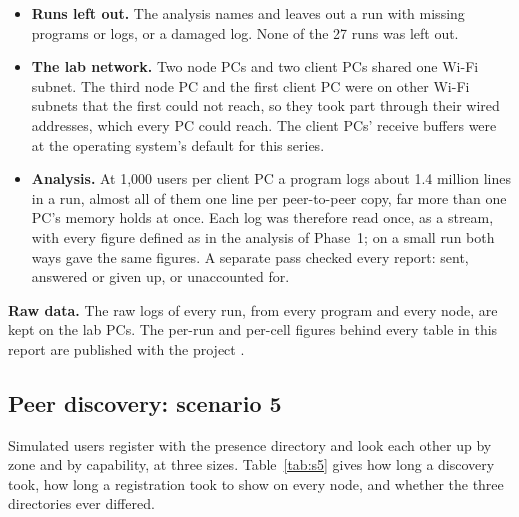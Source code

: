 \begin{itemize}
  \item \textbf{Runs left out.} The analysis names and leaves out a run with missing programs or logs, or a damaged log. None of the 27 runs was left out.
  \item \textbf{The lab network.} Two node PCs and two client PCs shared one Wi-Fi subnet. The third node PC and the first client PC were on other Wi-Fi subnets that the first could not reach, so they took part through their wired addresses, which every PC could reach. The client PCs' receive buffers were at the operating system's default for this series.
  \item \textbf{Analysis.} At 1,000 users per client PC a program logs about 1.4 million lines in a run, almost all of them one line per peer-to-peer copy, far more than one PC's memory holds at once. Each log was therefore read once, as a stream, with every figure defined as in the analysis of Phase~1; on a small run both ways gave the same figures. A separate pass checked every report: sent, answered or given up, or unaccounted for.
\end{itemize}

\textbf{Raw data.} The raw logs of every run, from every program and every node, are kept on the lab PCs. The per-run and per-cell figures behind every table in this report are published with the project \cite{repo}.

\subsection{Peer discovery: scenario 5}
\label{sec:s5}

Simulated users register with the presence directory and look each other up by zone and by capability, at three sizes. Table~\ref{tab:s5} gives how long a discovery took, how long a registration took to show on every node, and whether the three directories ever differed.

